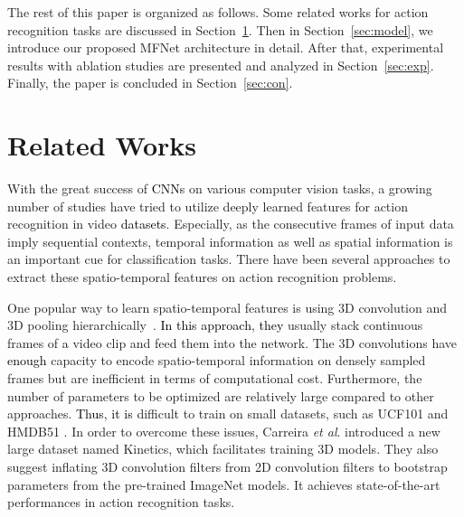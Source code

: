 \documentclass[runningheads]{llncs}
\newcommand{\etal}{\textit{et al}. }
\newcommand{\nj}[1]{\textcolor{black}{#1}}
\begin{document}
The rest of this paper is organized as follows. Some related works for action recognition tasks are discussed in Section~\ref{sec:rel}. Then in Section~\ref{sec:model}, we introduce our proposed MFNet architecture in detail. After that, experimental results with ablation studies are presented and analyzed in Section~\ref{sec:exp}. Finally, the paper is concluded in Section~\ref{sec:con}. 

\section{Related Works}
\label{sec:rel}

With the great success of \nj{CNNs} on various computer vision tasks, a growing number of studies have tried to utilize deeply learned features for action recognition in video \nj{datasets}. Especially, as the consecutive frames of input data imply sequential contexts, temporal information as well as spatial information is an important cue for classification tasks.
There have been several approaches to extract these spatio-temporal features on action recognition problems.

One popular way to learn spatio-temporal features is using 3D convolution and 3D pooling hierarchically~\cite{feichtenhofer2016spatiotemporal,hara2017learning,tran2015learning,tran2017convnet,zhang2016real}. \nj{In this approach, they} usually stack continuous frames of \nj{a} video clip and feed them into the network. The 3D convolutions have \nj{enough} capacity to encode spatio-temporal information on densely sampled frames but are inefficient in terms of computational cost. Furthermore, the number of parameters to be optimized are relatively large compared to other approaches. \nj{Thus, it is} difficult to train on small datasets, such as UCF101 \cite{soomro2012ucf101} and HMDB51 \cite{Kuehne11}.
In order to overcome these issues, Carreira \etal \cite{carreira2017quo} introduced a new large dataset named Kinetics\cite{kay2017kinetics}, which facilitates training 3D models. They also suggest inflating 3D convolution filters from 2D convolution filters to bootstrap parameters from the pre-trained ImageNet \cite{deng2009imagenet} models. It achieves state-of-the-art performances in action recognition tasks.
\end{document}
